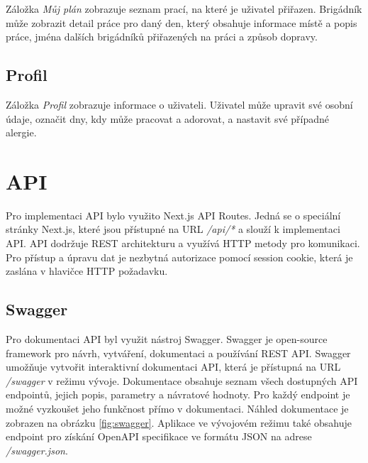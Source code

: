 Záložka \textit{Můj plán} zobrazuje seznam prací, na které je uživatel přiřazen. Brigádník může zobrazit detail práce pro daný den,
který obsahuje informace místě a popis práce, jména dalších brigádníků přiřazených na práci a způsob dopravy.

\subsection{Profil}

Záložka \textit{Profil} zobrazuje informace o uživateli. Uživatel může upravit své osobní údaje, označit dny, kdy může pracovat a adorovat,
a nastavit své případné alergie.

\section{API}

Pro implementaci API bylo využito Next.js API Routes. Jedná se o speciální stránky Next.js, které jsou přístupné na URL \textit{/api/*} a slouží k implementaci API.
API dodržuje REST architekturu a využívá HTTP metody pro komunikaci. Pro přístup a úpravu dat je nezbytná autorizace pomocí session cookie, která je zaslána v hlavičce HTTP požadavku.

\subsection{Swagger}

Pro dokumentaci API byl využit nástroj Swagger. Swagger je open-source framework pro návrh, vytváření, dokumentaci a používání REST API.
Swagger umožňuje vytvořit interaktivní dokumentaci API, která je přístupná na URL \textit{/swagger} v režimu vývoje. Dokumentace obsahuje seznam všech dostupných
API endpointů, jejich popis, parametry a návratové hodnoty. Pro každý endpoint je možné vyzkoušet jeho funkčnost přímo v dokumentaci.
Náhled dokumentace je zobrazen na obrázku \ref{fig:swagger}.
Aplikace ve vývojovém režimu také obsahuje endpoint pro získání OpenAPI specifikace ve formátu JSON na adrese \textit{/swagger.json}.

